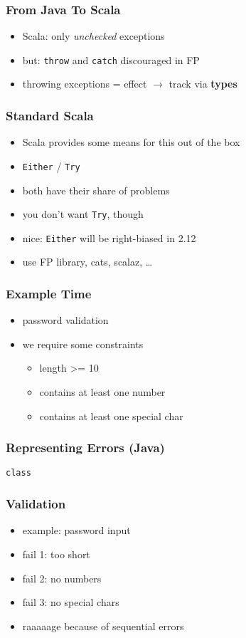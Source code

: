 \documentclass{beamer}
\begin{document}
\begin{frame}
  \frametitle{From Java To Scala}
  \begin{itemize}
  \item Scala: only \textit{unchecked} exceptions
  \item but: \texttt{throw} and \texttt{catch} discouraged in FP
  \item throwing exceptions = effect $\rightarrow$ track via \textbf{types}
  \end{itemize}
\end{frame}

\begin{frame}[fragile]
  \frametitle{Standard Scala}
  \begin{itemize}
  \item Scala provides some means for this out of the box
  \item \texttt{Either} / \texttt{Try}
  \item both have their share of problems
  \item you don't want \texttt{Try}, though
  \item nice: \texttt{Either} will be right-biased in 2.12
  \item use FP library, cats, scalaz, \dots
  \end{itemize}
\end{frame}

\begin{frame}[fragile]
  \frametitle{Example Time}
  \begin{itemize}
  \item password validation
  \item we require some constraints
    \begin{itemize}
    \item length >= 10
    \item contains at least one number
    \item contains at least one special char
    \end{itemize}
  \end{itemize}
\end{frame}

\begin{frame}[fragile]
  \frametitle{Representing Errors (Java)}
\begin{verbatim}
class 
\end{verbatim}
\end{frame}

\begin{frame}
  \frametitle{Validation}
  \begin{itemize}
  \item example: password input
  \item fail 1: too short
  \item fail 2: no numbers
  \item fail 3: no special chars
  \item raaaaage because of sequential errors
  \end{itemize}
\end{frame}
\end{document}
